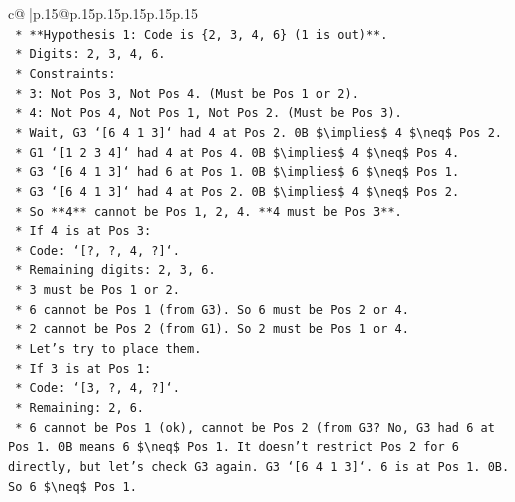 \documentclass{article}
\begin{document}
{\begin{supertabular}{c@{$\;$}|p{.15\linewidth}@{}p{.15\linewidth}p{.15\linewidth}p{.15\linewidth}p{.15\linewidth}p{.15\linewidth}}
{{{\\ 
\texttt{    *   **Hypothesis 1: Code is \{2, 3, 4, 6\} (1 is out)**.} \\
\texttt{        *   Digits: 2, 3, 4, 6.} \\
\texttt{        *   Constraints:} \\
\texttt{            *   3: Not Pos 3, Not Pos 4. (Must be Pos 1 or 2).} \\
\texttt{            *   4: Not Pos 4, Not Pos 1, Not Pos 2. (Must be Pos 3).} \\
\texttt{                *   Wait, G3 `{[}6 4 1 3{]}` had 4 at Pos 2. 0B \$\textbackslash{}implies\$ 4 \$\textbackslash{}neq\$ Pos 2.} \\
\texttt{                *   G1 `{[}1 2 3 4{]}` had 4 at Pos 4. 0B \$\textbackslash{}implies\$ 4 \$\textbackslash{}neq\$ Pos 4.} \\
\texttt{                *   G3 `{[}6 4 1 3{]}` had 6 at Pos 1. 0B \$\textbackslash{}implies\$ 6 \$\textbackslash{}neq\$ Pos 1.} \\
\texttt{                *   G3 `{[}6 4 1 3{]}` had 4 at Pos 2. 0B \$\textbackslash{}implies\$ 4 \$\textbackslash{}neq\$ Pos 2.} \\
\texttt{                *   So **4** cannot be Pos 1, 2, 4. **4 must be Pos 3**.} \\
\texttt{            *   If 4 is at Pos 3:} \\
\texttt{                *   Code: `{[}?, ?, 4, ?{]}`.} \\
\texttt{                *   Remaining digits: 2, 3, 6.} \\
\texttt{                *   3 must be Pos 1 or 2.} \\
\texttt{                *   6 cannot be Pos 1 (from G3). So 6 must be Pos 2 or 4.} \\
\texttt{                *   2 cannot be Pos 2 (from G1). So 2 must be Pos 1 or 4.} \\
\texttt{                *   Let's try to place them.} \\
\texttt{                *   If 3 is at Pos 1:} \\
\texttt{                    *   Code: `{[}3, ?, 4, ?{]}`.} \\
\texttt{                    *   Remaining: 2, 6.} \\
\texttt{                    *   6 cannot be Pos 1 (ok), cannot be Pos 2 (from G3? No, G3 had 6 at Pos 1. 0B means 6 \$\textbackslash{}neq\$ Pos 1. It doesn't restrict Pos 2 for 6 directly, but let's check G3 again. G3 `{[}6 4 1 3{]}`. 6 is at Pos 1. 0B. So 6 \$\textbackslash{}neq\$ Pos 1.} \\
}}}
\end{supertabular}}
\end{document}
